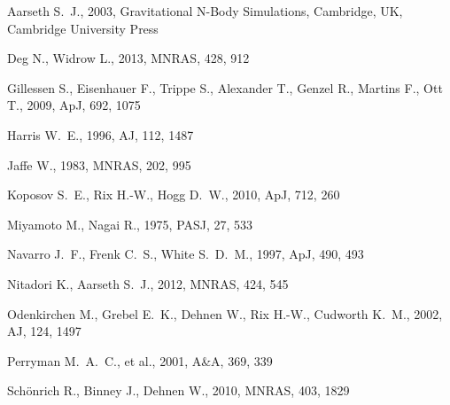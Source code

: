 Aarseth S.~J., 2003, Gravitational N-Body Simulations, Cambridge, UK, Cambridge University Press 

Deg N., Widrow L., 2013, MNRAS, 428, 912 

Gillessen S., Eisenhauer F., Trippe S., Alexander T., Genzel R., Martins F., Ott T., 2009, ApJ, 692, 1075 

Harris W.~E., 1996, AJ, 112, 1487 

Jaffe W., 1983, MNRAS, 202, 995 

Koposov S.~E., Rix H.-W., Hogg D.~W., 2010, ApJ, 712, 260 

Miyamoto M., Nagai R., 1975, PASJ, 27, 533 

Navarro J.~F., Frenk C.~S., White S.~D.~M., 1997, ApJ, 490, 493 

Nitadori K., Aarseth S.~J., 2012, MNRAS, 424, 545 

Odenkirchen M., Grebel E.~K., Dehnen W., Rix H.-W., Cudworth K.~M., 2002, AJ, 124, 1497 

Perryman M.~A.~C., et al., 2001, A\&A, 369, 339 

Sch{\"o}nrich R., Binney J., Dehnen W., 2010, MNRAS, 403, 1829 

